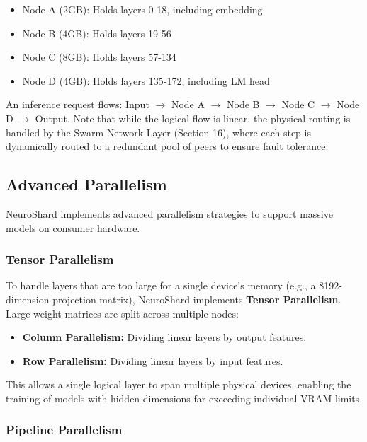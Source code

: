 \documentclass[11pt,a4paper]{article}
\begin{document}
\begin{itemize}
    \item Node A (2GB): Holds layers 0-18, including embedding
    \item Node B (4GB): Holds layers 19-56
    \item Node C (8GB): Holds layers 57-134
    \item Node D (4GB): Holds layers 135-172, including LM head
\end{itemize}

An inference request flows: Input $\rightarrow$ Node A $\rightarrow$ Node B $\rightarrow$ Node C $\rightarrow$ Node D $\rightarrow$ Output. Note that while the logical flow is linear, the physical routing is handled by the Swarm Network Layer (Section 16), where each step is dynamically routed to a redundant pool of peers to ensure fault tolerance.

\subsection{Advanced Parallelism}

NeuroShard implements advanced parallelism strategies to support massive models on consumer hardware.

\subsubsection{Tensor Parallelism}

To handle layers that are too large for a single device's memory (e.g., a 8192-dimension projection matrix), NeuroShard implements \textbf{Tensor Parallelism}. Large weight matrices are split across multiple nodes:

\begin{itemize}
    \item \textbf{Column Parallelism:} Dividing linear layers by output features.
    \item \textbf{Row Parallelism:} Dividing linear layers by input features.
\end{itemize}

This allows a single logical layer to span multiple physical devices, enabling the training of models with hidden dimensions far exceeding individual VRAM limits.

\subsubsection{Pipeline Parallelism}
\end{document}
